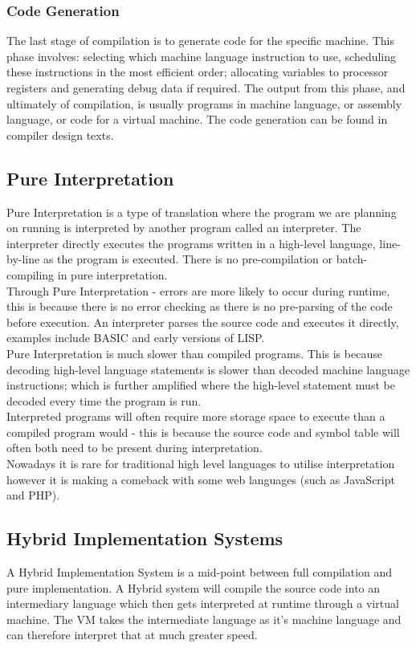 \subsubsection{Code Generation}
The last stage of compilation is to generate code for the specific machine. This phase involves: selecting which machine language instruction to use, scheduling these instructions in the most efficient order; allocating variables to processor registers and generating debug data if required. The output from this phase, and ultimately of compilation, is usually programs in machine language, or assembly language, or code for a virtual machine. The code generation can be found in compiler design texts.

\subsection{Pure Interpretation}
Pure Interpretation is a type of translation where the program we are planning on running is interpreted by another program called an interpreter. The interpreter directly executes the programs written in a high-level language, line-by-line as the program is executed. There is no pre-compilation or batch-compiling in pure interpretation.\\

Through Pure Interpretation - errors are more likely to occur during runtime, this is because there is no error checking as there is no pre-parsing of the code before execution. An interpreter parses the source code and executes it directly, examples include BASIC and early versions of LISP.\\

Pure Interpretation is much slower than compiled programs. This is because decoding high-level language statements is slower than decoded machine language instructions; which is further amplified where the high-level statement must be decoded every time the program is run.\\

Interpreted programs will often require more storage space to execute than a compiled program would - this is because the source code and symbol table will often both need to be present during interpretation.\\

Nowadays it is rare for traditional high level languages to utilise interpretation however it is making a comeback with some web languages (such as JavaScript and PHP).

\subsection{Hybrid Implementation Systems}
A Hybrid Implementation System  is a mid-point between full compilation and pure implementation. A Hybrid system  will compile the source code into an intermediary language which then gets interpreted at runtime through a virtual machine. The VM takes the intermediate language as it's machine language and can therefore interpret that at much greater speed.

